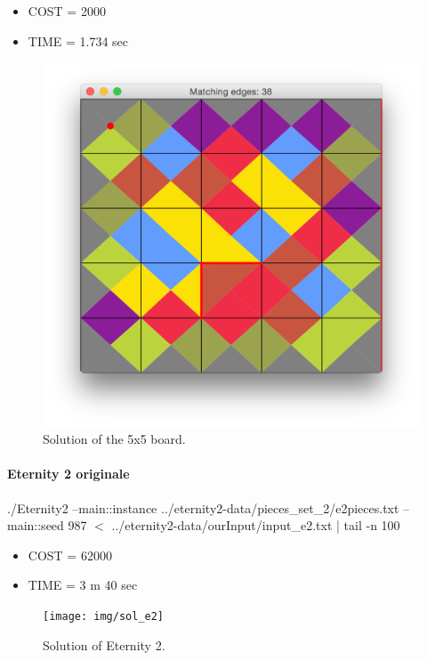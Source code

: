 	\begin{itemize}
		\item COST = 2000
		\item TIME = 1.734 sec
	\end{itemize}
	\begin{figure}[H]
	\centering
	\includegraphics[scale=0.25]{img/sol_05x05}
	\caption{Solution of the 5x5 board.}
	\end{figure}


	\paragraph{Eternity 2 originale}
	./Eternity2 --main::instance ../eternity2-data/pieces\_set\_2/e2pieces.txt --main::seed 987 $<$ ../eternity2-data/ourInput/input\_e2.txt | tail -n 100

	\begin{itemize}
		\item COST = 62000
		\item TIME = 3 m 40 sec
	\end{itemize}
	\begin{figure}[H]
	\centering
	\texttt{[image: img/sol\_e2]}
	\caption{Solution of Eternity 2.}
	\end{figure}














